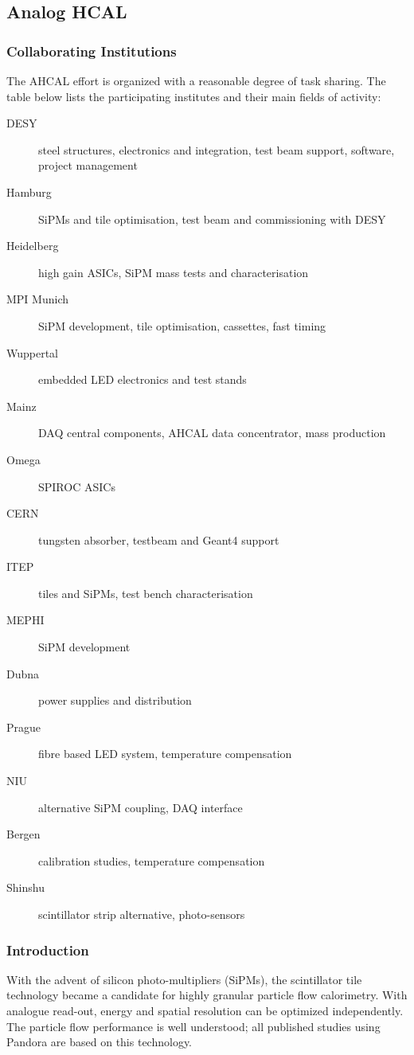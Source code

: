 \subsection{Analog HCAL}
\subsubsection{Collaborating Institutions}
The AHCAL effort is organized with a reasonable degree of task sharing. The table below lists the participating institutes and their main fields of activity:
\begin{description}
\item[DESY] steel structures, electronics and integration, test beam support, software, project management
\item[Hamburg] SiPMs and tile optimisation, test beam and commissioning with DESY 
\item[Heidelberg] high gain ASICs, SiPM mass tests and characterisation  
\item[MPI Munich] SiPM development, tile optimisation, cassettes, fast timing
\item[Wuppertal] embedded LED electronics and test stands
\item[Mainz] DAQ central components, AHCAL data concentrator, mass production
\item[Omega] SPIROC ASICs 
\item[CERN] tungsten absorber, testbeam and Geant4 support 
\item[ITEP] tiles and SiPMs, test bench characterisation
\item[MEPHI] SiPM development
\item[Dubna] power supplies and distribution
\item[Prague] fibre based LED system, temperature compensation
\item[NIU] alternative SiPM coupling, DAQ interface
\item[Bergen] calibration studies, temperature compensation
\item[Shinshu] scintillator strip alternative, photo-sensors
\end{description}
\subsubsection{Introduction}
With the advent of silicon photo-multipliers (SiPMs), the scintillator tile technology became a candidate for highly granular particle flow calorimetry. With analogue read-out, energy and spatial resolution can be optimized independently. The particle flow performance is well understood; all published studies using Pandora are based on this technology. 

